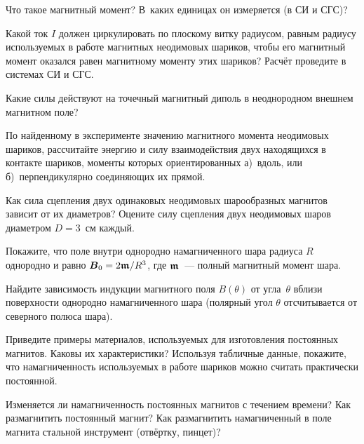 \begin{lab:questions}

\item Что такое магнитный момент? 
В~каких единицах он измеряется (в СИ и СГС)?

\item Какой ток $I$ должен циркулировать по плоскому витку радиусом, равным радиусу
используемых в работе магнитных неодимовых шариков, чтобы его магнитный момент
оказался равен магнитному моменту этих шариков? Расчёт проведите 
в системах СИ и СГС.

\item Какие силы действуют на точечный магнитный диполь 
в неоднородном внешнем магнитном поле?

\item По найденному в эксперименте значению магнитного момента неодимовых 
шариков, рассчитайте энергию и силу взаимодействия двух находящихся в контакте 
шариков, моменты которых ориентированных а)~вдоль, или б)~перпендикулярно соединяющих их прямой.

\item Как сила сцепления двух одинаковых неодимовых шарообразных магнитов 
зависит от их диаметров? Оцените силу сцепления двух 
неодимовых шаров диаметром $D=3$~см каждый. 

\item Покажите, что поле внутри однородно намагниченного шара 
радиуса  $R$ однородно и равно ${\boldsymbol{B}}_0=2{\boldsymbol{\mathfrak{m}}}/R^3$, 
где ${\boldsymbol{\mathfrak{m}}}$~--- полный магнитный момент шара. 

\item Найдите зависимость индукции магнитного поля  $B(\theta )$ 
от угла~$\theta $ вблизи поверхности однородно намагниченного шара 
(полярный угол $\theta $ отсчитывается от северного полюса шара).


\item Приведите примеры материалов, используемых для изготовления 
постоянных магнитов. Каковы их характеристики? Используя табличные данные,
покажите, что намагниченность используемых в работе шариков можно 
считать практически постоянной.

\item Изменяется ли намагниченность постоянных магнитов с течением времени? 
Как размагнитить постоянный магнит? 
Как размагнитить намагниченный в поле магнита стальной инструмент 
(отвёртку,  пинцет)?


\end{lab:questions}
